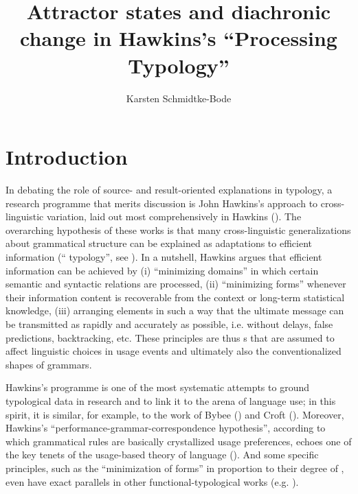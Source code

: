 \documentclass[output=paper]{langsci/langscibook}
\author{Karsten Schmidtke-Bode\affiliation{Leipzig University and Friedrich Schiller University Jena}}
\title{Attractor states and diachronic change in Hawkins’s “Processing Typology”}
\begin{document}
\maketitle 
 
\section{Introduction} 

In debating the role of source- and result-oriented explanations in typology, a research programme that merits discussion is John Hawkins’s approach to cross-linguistic variation, laid out most comprehensively in Hawkins (\citeyear{Hawkins1994_Perf,Hawkins2004_Eff,Hawkins2014_VarEff}). The overarching hypothesis of these works is that many cross-linguistic generalizations about grammatical structure can be explained as adaptations to efficient information  (“ typology”, see \citealt{Hawkins2007_Proc}). In a nutshell, Hawkins argues that efficient information  can be achieved by (i) “minimizing domains” in which certain semantic and syntactic relations are processed, (ii) “minimizing forms” whenever their information content is recoverable from the context or long-term statistical knowledge, (iii) arranging elements in such a way that the ultimate message can be transmitted as rapidly and accurately as possible, i.e. without delays, false predictions, backtracking, etc. These  principles are thus s that are assumed to affect linguistic choices in usage events and ultimately also the conventionalized shapes of grammars.

Hawkins’s programme is one of the most systematic attempts to ground typological data in  research and to link it to the arena of language use; in this spirit, it is similar, for example, to the work of Bybee (\citeyear{Bybee1985_Morph,Bybee2010_Cogn}) and Croft (\citeyear{Croft2001_RadCon,Croft2003_Typ}). Moreover, Hawkins’s “performance-grammar-correspondence hypothesis”, according to which grammatical rules are basically crystallized usage preferences, echoes one of the key tenets of the usage-based theory of language (\citealt{Langacker1987_Found,Kemmer2000_Intro}). And some specific  principles, such as the “minimization of forms” in proportion to their degree of , even have exact parallels in other functional-typological works (e.g. \citealt{Haiman1983_Icon,Croft2003_Typ,Haspelmath2008_Econ}). 
\end{document}
